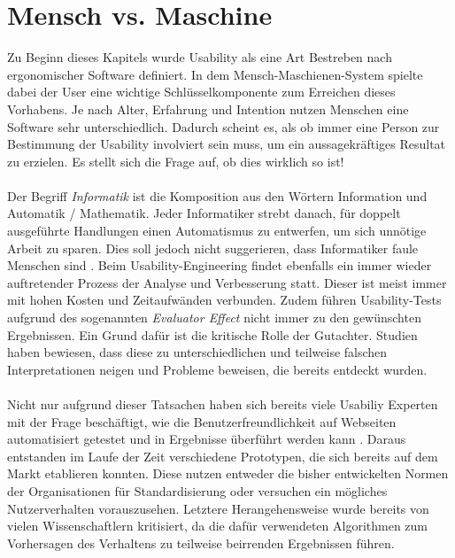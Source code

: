 %
%
%
%

\section{Mensch vs. Maschine}

Zu Beginn dieses Kapitels wurde Usability als eine Art Bestreben nach ergonomischer Software definiert. In dem Mensch-Maschienen-System spielte dabei der User eine wichtige Schlüsselkomponente zum Erreichen dieses Vorhabens. Je nach Alter, Erfahrung und Intention nutzen Menschen eine Software sehr unterschiedlich. Dadurch scheint es, als ob immer eine Person zur Bestimmung der Usability involviert sein muss, um ein aussagekräftiges Resultat zu erzielen. Es stellt sich die Frage auf, ob dies wirklich so ist!\\
\\
Der Begriff \textit{Informatik} ist die Komposition aus den Wörtern Information und Automatik / Mathematik. Jeder Informatiker strebt danach, für doppelt ausgeführte Handlungen einen Automatismus zu entwerfen, um sich unnötige Arbeit zu sparen. Dies soll jedoch nicht suggerieren, dass Informatiker faule Menschen sind \cite{lazy}. Beim Usability-Engineering findet ebenfalls ein immer wieder auftretender Prozess der Analyse und Verbesserung statt. Dieser ist meist immer mit hohen Kosten und Zeitaufwänden verbunden. Zudem führen Usability-Tests aufgrund des sogenannten \textit{\glqq Evaluator Effect\grqq{}} \cite{anzahlTestpersonen} nicht immer zu den gewünschten Ergebnissen. Ein Grund dafür ist die kritische Rolle der Gutachter. Studien haben bewiesen, dass diese zu unterschiedlichen und teilweise falschen Interpretationen neigen und Probleme beweisen, die bereits entdeckt wurden.\\
\\
Nicht nur aufgrund dieser Tatsachen haben sich bereits viele Usabiliy Experten mit der Frage beschäftigt, wie die Benutzerfreundlichkeit auf Webseiten automatisiert getestet und in Ergebnisse überführt werden kann \cite{automatisierteUsabilityTests}. Daraus entstanden im Laufe der Zeit verschiedene Prototypen, die sich bereits auf dem Markt etablieren konnten. Diese nutzen entweder die bisher entwickelten Normen der Organisationen für Standardisierung oder versuchen ein mögliches Nutzerverhalten vorauszusehen. Letztere Herangehensweise wurde bereits von vielen Wissenschaftlern kritisiert, da die dafür verwendeten Algorithmen zum Vorhersagen des Verhaltens zu teilweise beirrenden Ergebnissen führen.\\
